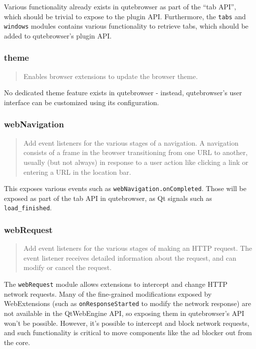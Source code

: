 \documentclass[a4paper,parskip=full]{scrreprt}
\begin{document}
Various functionality already exists in qutebrowser as part of the ``tab API'',
which should be trivial to expose to the plugin API. Furthermore, the
\verb|tabs| and \verb|windows| modules contains various functionality to
retrieve tabs, which should be added to qutebrowser's plugin API.

\subsubsection{theme}
\begin{quote}
Enables browser extensions to update the browser theme.
\end{quote}

No dedicated theme feature exists in qutebrowser - instead, qutebrowser's user
interface can be customized using its configuration.

\subsubsection{webNavigation}
\begin{quote}
Add event listeners for the various stages of a navigation. A navigation consists of a frame in the browser transitioning from one URL to another, usually (but not always) in response to a user action like clicking a link or entering a URL in the location bar.
\end{quote}

This exposes various events such as \verb|webNavigation.onCompleted|. Those will
be exposed as part of the tab API in qutebrowser, as Qt signals such as \verb|load_finished|.

\subsubsection{webRequest}
\begin{quote}
Add event listeners for the various stages of making an HTTP request. The event listener receives detailed information about the request, and can modify or cancel the request.
\end{quote}

The \verb|webRequest| module allows extensions to intercept and change HTTP
network requests. Many of the fine-grained modifications exposed by
WebExtensions (such as \verb|onResponseStarted| to modify the network response)
are not available in the QtWebEngine API, so exposing them in qutebrowser's API
won't be possible. However, it's possible to intercept and block network
requests, and such functionality is critical to move components like the ad
blocker out from the core.
\end{document}
